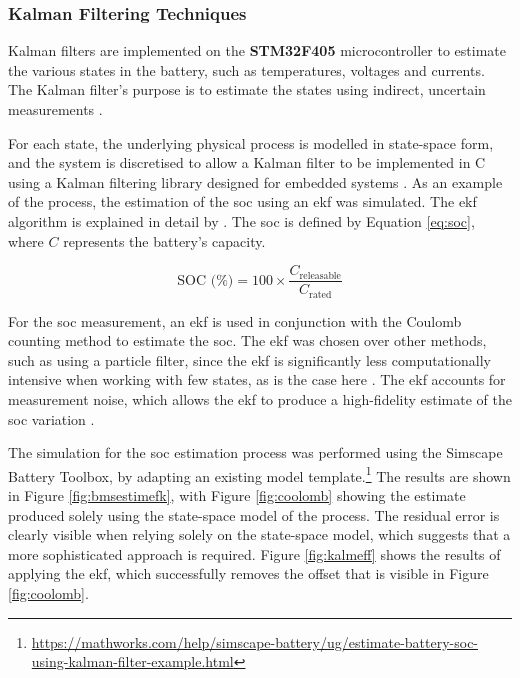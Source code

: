 \subsubsection{Kalman Filtering Techniques}
\label{kalm}

Kalman filters are implemented on the \textbf{STM32F405} microcontroller to estimate the various states in the battery, such as temperatures, voltages and currents. The Kalman filter's purpose is to estimate the states using indirect, uncertain measurements \cite{kalfilt}. 

For each state, the underlying physical process is modelled in state-space form, and the system is discretised to allow a Kalman filter to be implemented in C using a Kalman filtering library designed for embedded systems \cite{computers11110165}. As an example of the process, the estimation of the \gls{soc} using an \gls{ekf} was simulated. The \gls{ekf} algorithm is explained in detail by \cite{kalfilt}.  The \gls{soc} is defined by Equation \ref{eq:soc}, where $C$ represents the battery's capacity.

\begin{equation}
\label{eq:soc}
\text{SOC (\%)} = 100 \times \frac{C_{\text{releasable}}}{C_{\text{rated}}}
\end{equation}

For the \gls{soc} measurement, an \gls{ekf} is used in conjunction with the Coulomb counting method to estimate the \gls{soc}. The \gls{ekf} was chosen over other methods, such as using a particle filter, since the \gls{ekf} is significantly less computationally intensive when working with few states, as is the case here \cite{STELZER20171483}. The \gls{ekf} accounts for measurement noise, which allows the \gls{ekf} to produce a high-fidelity estimate of the \gls{soc} variation \cite{Zaki2025}.

 The simulation for the \gls{soc} estimation process was performed using the Simscape Battery Toolbox, by adapting an existing model template.\footnote{\url{https://mathworks.com/help/simscape-battery/ug/estimate-battery-soc-using-kalman-filter-example.html}} The results are shown in Figure \ref{fig:bmsestimefk}, with Figure \ref{fig:coolomb} showing the estimate produced solely using the state-space model of the process. The residual error is clearly visible when relying solely on the state-space model, which suggests that a more sophisticated approach is required. Figure \ref{fig:kalmeff} shows the results of applying the \gls{ekf}, which successfully removes the offset that is visible in Figure \ref{fig:coolomb}.


